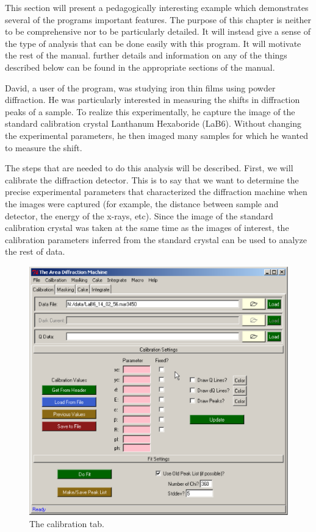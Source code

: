 This section will present a pedagogically interesting 
example which demonstrates several of the programs important
features.  The purpose of this chapter is neither to be 
comprehensive nor to be particularly detailed. It will instead 
give a sense of the type of analysis that can be done easily with 
this program. It will motivate the rest of the manual. further details 
and information on any of the things described below can be found in 
the appropriate sections of the manual.

David, a user of the program, was studying iron thin films 
using powder diffraction. He was particularly interested in 
measuring the shifts in diffraction peaks of a sample. To 
realize this experimentally, he capture the image of the 
standard calibration crystal Lanthanum Hexaboride (LaB6). 
Without changing the experimental parameters, he then imaged 
many samples for which he wanted to measure the shift.

The steps that are needed to do this analysis will be
described. First, we will calibrate the diffraction detector.
This is to say that we want to determine the precise 
experimental parameters that characterized the diffraction
machine when the images were captured (for example, the distance
between sample and detector, the energy of the x-rays, etc). Since 
the image of the standard calibration crystal was taken at the same
time as the images of interest, the calibration parameters inferred
from the standard crystal can be used to analyze the
rest of data.

\begin{figure}
    \centering
    \includegraphics[scale=.75]{figures/calibration_page.eps}
    \caption{The calibration tab.}
    \label{calibration_page_example}
\end{figure}

